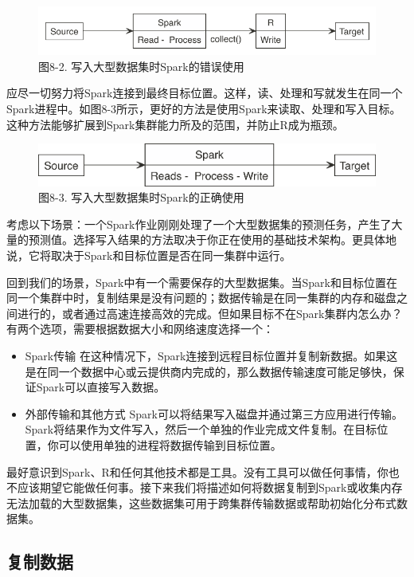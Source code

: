 \documentclass[
]{article}
\providecommand{\tightlist}{%
  \setlength{\itemsep}{0pt}\setlength{\parskip}{0pt}}
\begin{document}
\begin{figure}
\centering
\includegraphics{figures/8_2.png}
\caption{图8-2. 写入大型数据集时Spark的错误使用}
\end{figure}

应尽一切努力将Spark连接到最终目标位置。这样，读、处理和写就发生在同一个Spark进程中。如图8-3所示，更好的方法是使用Spark来读取、处理和写入目标。这种方法能够扩展到Spark集群能力所及的范围，并防止R成为瓶颈。

\begin{figure}
\centering
\includegraphics{figures/8_3.png}
\caption{图8-3. 写入大型数据集时Spark的正确使用}
\end{figure}

考虑以下场景：一个Spark作业刚刚处理了一个大型数据集的预测任务，产生了大量的预测值。选择写入结果的方法取决于你正在使用的基础技术架构。更具体地说，它将取决于Spark和目标位置是否在同一集群中运行。

回到我们的场景，Spark中有一个需要保存的大型数据集。当Spark和目标位置在同一个集群中时，复制结果是没有问题的；数据传输是在同一集群的内存和磁盘之间进行的，或者通过高速连接高效的完成。但如果目标不在Spark集群内怎么办？有两个选项，需要根据数据大小和网络速度选择一个：

\begin{itemize}
\tightlist
\item
  Spark传输
  在这种情况下，Spark连接到远程目标位置并复制新数据。如果这是在同一个数据中心或云提供商内完成的，那么数据传输速度可能足够快，保证Spark可以直接写入数据。
\item
  外部传输和其他方式
  Spark可以将结果写入磁盘并通过第三方应用进行传输。Spark将结果作为文件写入，然后一个单独的作业完成文件复制。在目标位置，你可以使用单独的进程将数据传输到目标位置。
\end{itemize}

最好意识到Spark、R和任何其他技术都是工具。没有工具可以做任何事情，你也不应该期望它能做任何事。接下来我们将描述如何将数据复制到Spark或收集内存无法加载的大型数据集，这些数据集可用于跨集群传输数据或帮助初始化分布式数据集。

\hypertarget{ux590dux5236ux6570ux636e}{%
\subsection{复制数据}\label{ux590dux5236ux6570ux636e}}
\end{document}
